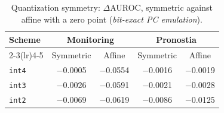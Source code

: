 \begin{table}[htbp]
\centering
\caption{Quantization symmetry: $\Delta$AUROC, symmetric against affine with a zero point (\emph{bit-exact PC emulation}).}
\label{tab:annex-symmetry}
\begin{tabular}{lcccc}
\toprule
Scheme & \multicolumn{2}{c}{Monitoring} & \multicolumn{2}{c}{Pronostia} \\
\cmidrule(lr){2-3}\cmidrule(lr){4-5}
 & Symmetric & Affine & Symmetric & Affine \\
\midrule
\texttt{int4} & \num{-0.0005} & \num{-0.0554} & \num{-0.0016} & \num{-0.0019} \\
\texttt{int3} & \num{-0.0026} & \num{-0.0591} & \num{-0.0021} & \num{-0.0028} \\
\texttt{int2} & \num{-0.0069} & \num{-0.0619} & \num{-0.0086} & \num{-0.0125} \\
\bottomrule
\end{tabular}
\end{table}
